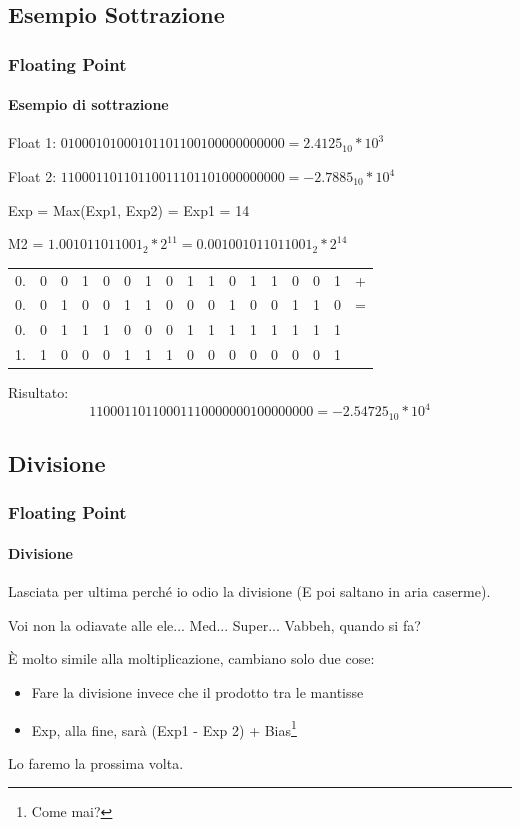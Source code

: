 \documentclass{beamer}
\begin{document}
  \subsection{Esempio Sottrazione}
  \begin{frame}
  		\frametitle{Floating Point}
  		\framesubtitle{Esempio di sottrazione}
  		Float 1: $01000101000101101100100000000000 = 2.4125_{10} * 10^{3}$
  		
  		Float 2: $11000110110110011101101000000000 = -2.7885_{10} * 10^{4}$
  		
  		\vspace{2em}
  		\pause
  		
    Exp = Max(Exp1, Exp2) = Exp1 = 14
    
    M2 = $1.001011011001_{2} * 2^{11} = 0.001001011011001_{2} * 2^{14}$
    \vspace{1em}
    
    \setlength{\tabcolsep}{2pt}
    \begin{center}
    		\begin{tabular}{cccccccccccccccc|c}
    		0. & 0 & 0 & 1 & 0 & 0 & 1 & 0 & 1 & 1 & 0 & 1 & 1 & 0 & 0 & 1 & + \\ 
    		0. & 0 & 1 & 0 & 0 & 1 & 1 & 0 & 0 & 0 & 1 & 0 & 0 & 1 & 1 & 0 & = \\ 
    		\hline 
    		0. & 0 & 1 & 1 & 1 & 0 & 0 & 0 & 1 & 1 & 1 & 1 & 1 & 1 & 1 & 1 &  \\
    		\hline
    		1. & 1 & 0 & 0 & 0 & 1 & 1 & 1 & 0 & 0 & 0 & 0 & 0 & 0 & 0 & 1 &  \\
    		\end{tabular} 
    \end{center}
    
    \pause 
    \vspace{1em}
    Risultato:
    $$11000110110001110000000100000000 = -2.54725_{10} * 10^{4}$$
  		
  \end{frame}
  \subsection{Divisione}
  \begin{frame}
  		\frametitle{Floating Point}
  		\framesubtitle{Divisione}
  		Lasciata per ultima perché io odio la divisione (E poi saltano in aria caserme).
  		
  		\vspace{2em}
  		\pause
  		
  		Voi non la odiavate alle ele... Med... Super... Vabbeh, quando si fa?
  		
  		\vspace{2em}
  		\pause
  		
  		È molto simile alla moltiplicazione, cambiano solo due cose:
  		\begin{itemize}
  			\item Fare la divisione invece che il prodotto tra le mantisse
  			\item Exp, alla fine, sarà (Exp1 - Exp 2) + Bias\footnote{Come mai?}
  		\end{itemize}
  		
  		Lo faremo la prossima volta.
  \end{frame}
\end{document}
